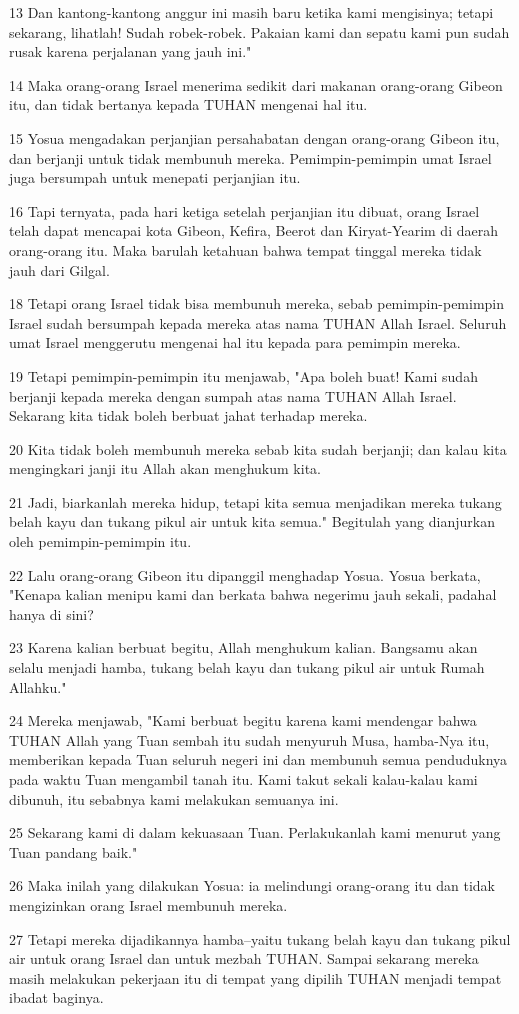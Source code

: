 \par 13 Dan kantong-kantong anggur ini masih baru ketika kami mengisinya; tetapi sekarang, lihatlah! Sudah robek-robek. Pakaian kami dan sepatu kami pun sudah rusak karena perjalanan yang jauh ini."
\par 14 Maka orang-orang Israel menerima sedikit dari makanan orang-orang Gibeon itu, dan tidak bertanya kepada TUHAN mengenai hal itu.
\par 15 Yosua mengadakan perjanjian persahabatan dengan orang-orang Gibeon itu, dan berjanji untuk tidak membunuh mereka. Pemimpin-pemimpin umat Israel juga bersumpah untuk menepati perjanjian itu.
\par 16 Tapi ternyata, pada hari ketiga setelah perjanjian itu dibuat, orang Israel telah dapat mencapai kota Gibeon, Kefira, Beerot dan Kiryat-Yearim di daerah orang-orang itu. Maka barulah ketahuan bahwa tempat tinggal mereka tidak jauh dari Gilgal.
\par 18 Tetapi orang Israel tidak bisa membunuh mereka, sebab pemimpin-pemimpin Israel sudah bersumpah kepada mereka atas nama TUHAN Allah Israel. Seluruh umat Israel menggerutu mengenai hal itu kepada para pemimpin mereka.
\par 19 Tetapi pemimpin-pemimpin itu menjawab, "Apa boleh buat! Kami sudah berjanji kepada mereka dengan sumpah atas nama TUHAN Allah Israel. Sekarang kita tidak boleh berbuat jahat terhadap mereka.
\par 20 Kita tidak boleh membunuh mereka sebab kita sudah berjanji; dan kalau kita mengingkari janji itu Allah akan menghukum kita.
\par 21 Jadi, biarkanlah mereka hidup, tetapi kita semua menjadikan mereka tukang belah kayu dan tukang pikul air untuk kita semua." Begitulah yang dianjurkan oleh pemimpin-pemimpin itu.
\par 22 Lalu orang-orang Gibeon itu dipanggil menghadap Yosua. Yosua berkata, "Kenapa kalian menipu kami dan berkata bahwa negerimu jauh sekali, padahal hanya di sini?
\par 23 Karena kalian berbuat begitu, Allah menghukum kalian. Bangsamu akan selalu menjadi hamba, tukang belah kayu dan tukang pikul air untuk Rumah Allahku."
\par 24 Mereka menjawab, "Kami berbuat begitu karena kami mendengar bahwa TUHAN Allah yang Tuan sembah itu sudah menyuruh Musa, hamba-Nya itu, memberikan kepada Tuan seluruh negeri ini dan membunuh semua penduduknya pada waktu Tuan mengambil tanah itu. Kami takut sekali kalau-kalau kami dibunuh, itu sebabnya kami melakukan semuanya ini.
\par 25 Sekarang kami di dalam kekuasaan Tuan. Perlakukanlah kami menurut yang Tuan pandang baik."
\par 26 Maka inilah yang dilakukan Yosua: ia melindungi orang-orang itu dan tidak mengizinkan orang Israel membunuh mereka.
\par 27 Tetapi mereka dijadikannya hamba--yaitu tukang belah kayu dan tukang pikul air untuk orang Israel dan untuk mezbah TUHAN. Sampai sekarang mereka masih melakukan pekerjaan itu di tempat yang dipilih TUHAN menjadi tempat ibadat baginya.

